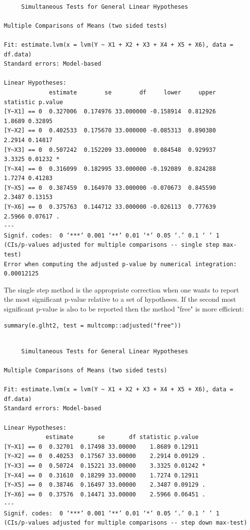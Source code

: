 \documentclass[12pt]{article}
\begin{document}
\begin{verbatim}

	 Simultaneous Tests for General Linear Hypotheses

Multiple Comparisons of Means (two sided tests) 

Fit: estimate.lvm(x = lvm(Y ~ X1 + X2 + X3 + X4 + X5 + X6), data = df.data)
Standard errors: Model-based

Linear Hypotheses:
             estimate        se        df     lower     upper statistic p.value  
[Y~X1] == 0  0.327006  0.174976 33.000000 -0.158914  0.812926    1.8689 0.32895  
[Y~X2] == 0  0.402533  0.175670 33.000000 -0.085313  0.890380    2.2914 0.14817  
[Y~X3] == 0  0.507242  0.152209 33.000000  0.084548  0.929937    3.3325 0.01232 *
[Y~X4] == 0  0.316099  0.182995 33.000000 -0.192089  0.824288    1.7274 0.41283  
[Y~X5] == 0  0.387459  0.164970 33.000000 -0.070673  0.845590    2.3487 0.13153  
[Y~X6] == 0  0.375763  0.144712 33.000000 -0.026113  0.777639    2.5966 0.07617 .
---
Signif. codes:  0 ‘***’ 0.001 ‘**’ 0.01 ‘*’ 0.05 ‘.’ 0.1 ‘ ’ 1
(CIs/p-values adjusted for multiple comparisons -- single step max-test) 
Error when computing the adjusted p-value by numerical integration: 0.00012125
\end{verbatim}

The single step method is the appropriate correction when one wants to
report the most significant p-value relative to a set of
hypotheses. If the second most significant p-value is also to be
reported then the method "free" is more efficient:
\lstset{language=r,label= ,caption= ,captionpos=b,numbers=none}
\begin{lstlisting}
summary(e.glht2, test = multcomp::adjusted("free"))
\end{lstlisting}

\begin{verbatim}

	 Simultaneous Tests for General Linear Hypotheses

Multiple Comparisons of Means (two sided tests) 

Fit: estimate.lvm(x = lvm(Y ~ X1 + X2 + X3 + X4 + X5 + X6), data = df.data)
Standard errors: Model-based

Linear Hypotheses:
            estimate       se       df statistic p.value  
[Y~X1] == 0  0.32701  0.17498 33.00000    1.8689 0.12911  
[Y~X2] == 0  0.40253  0.17567 33.00000    2.2914 0.09129 .
[Y~X3] == 0  0.50724  0.15221 33.00000    3.3325 0.01242 *
[Y~X4] == 0  0.31610  0.18299 33.00000    1.7274 0.12911  
[Y~X5] == 0  0.38746  0.16497 33.00000    2.3487 0.09129 .
[Y~X6] == 0  0.37576  0.14471 33.00000    2.5966 0.06451 .
---
Signif. codes:  0 ‘***’ 0.001 ‘**’ 0.01 ‘*’ 0.05 ‘.’ 0.1 ‘ ’ 1
(CIs/p-values adjusted for multiple comparisons -- step down max-test)
\end{verbatim}
\end{document}
